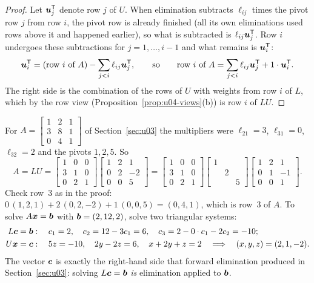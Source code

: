 \begin{proof}
Let $\boldsymbol{u}_j^{\mathsf{T}}$ denote row $j$ of $U$. When elimination subtracts $\ell_{ij}$ times the pivot
row $j$ from row $i$, the pivot row is already finished (all its own eliminations used rows
above it and happened earlier), so what is subtracted is $\ell_{ij}\boldsymbol{u}_j^{\mathsf{T}}$. Row $i$
undergoes these subtractions for $j=1,\dots,i-1$ and what remains is $\boldsymbol{u}_i^{\mathsf{T}}$:
\[
  \boldsymbol{u}_i^{\mathsf{T}}=(\text{row $i$ of }A)-\sum_{j<i}\ell_{ij}\boldsymbol{u}_j^{\mathsf{T}},
  \qquad\text{so}\qquad
  \text{row $i$ of }A=\sum_{j<i}\ell_{ij}\boldsymbol{u}_j^{\mathsf{T}}+1\cdot\boldsymbol{u}_i^{\mathsf{T}} .
\]
The right side is the combination of the rows of $U$ with weights from row $i$ of $L$, which
by the row view (Proposition~\ref{prop:u04-views}(b)) is row $i$ of $LU$.
\end{proof}

\begin{example}\label{ex:u05-LU3}
For $A=\begin{bmatrix} 1&2&1\\ 3&8&1\\ 0&4&1\end{bmatrix}$ of Section~\ref{sec:u03} the
multipliers were $\ell_{21}=3$, $\ell_{31}=0$, $\ell_{32}=2$ and the pivots $1,2,5$. So
\[
  A=LU=\begin{bmatrix} 1&0&0\\ 3&1&0\\ 0&2&1\end{bmatrix}
  \begin{bmatrix} 1&2&1\\ 0&2&-2\\ 0&0&5\end{bmatrix}
  =\begin{bmatrix} 1&0&0\\ 3&1&0\\ 0&2&1\end{bmatrix}
  \begin{bmatrix} 1&&\\ &2&\\ &&5\end{bmatrix}
  \begin{bmatrix} 1&2&1\\ 0&1&-1\\ 0&0&1\end{bmatrix}.
\]
Check row~3 as in the proof: $0\,(1,2,1)+2\,(0,2,-2)+1\,(0,0,5)=(0,4,1)$, which is row~3 of
$A$. To solve $A\boldsymbol{x}=\boldsymbol{b}$ with $\boldsymbol{b}=(2,12,2)$, solve two triangular systems:
\begin{align*}
  L\boldsymbol{c}=\boldsymbol{b}&:\quad c_1=2,\quad c_2=12-3c_1=6,\quad c_3=2-0\cdot c_1-2c_2=-10;\\
  U\boldsymbol{x}=\boldsymbol{c}&:\quad 5z=-10,\quad 2y-2z=6,\quad x+2y+z=2\quad\Longrightarrow\quad (x,y,z)=(2,1,-2).
\end{align*}
The vector $\boldsymbol{c}$ is exactly the right-hand side that forward elimination produced in
Section~\ref{sec:u03}: solving $L\boldsymbol{c}=\boldsymbol{b}$ \emph{is} elimination applied to $\boldsymbol{b}$.
\end{example}

